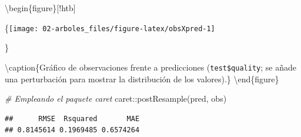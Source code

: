 \documentclass[
  spanish,
]{book}
\newenvironment{Shaded}{\begin{snugshade}}{\end{snugshade}}
\newcommand{\AttributeTok}[1]{\textcolor[rgb]{0.77,0.63,0.00}{#1}}
\newcommand{\CommentTok}[1]{\textcolor[rgb]{0.56,0.35,0.01}{\textit{#1}}}
\newcommand{\DecValTok}[1]{\textcolor[rgb]{0.00,0.00,0.81}{#1}}
\newcommand{\FunctionTok}[1]{\textcolor[rgb]{0.00,0.00,0.00}{#1}}
\newcommand{\NormalTok}[1]{#1}
\newcommand{\OtherTok}[1]{\textcolor[rgb]{0.56,0.35,0.01}{#1}}
\newcommand{\SpecialCharTok}[1]{\textcolor[rgb]{0.00,0.00,0.00}{#1}}
\newcommand{\StringTok}[1]{\textcolor[rgb]{0.31,0.60,0.02}{#1}}
\theoremstyle{break}
\theoremstyle{definition}
\theoremstyle{definition}
\theoremstyle{definition}
\theoremstyle{definition}
\theoremstyle{remark}
\begin{document}
\begin{Shaded}
\end{Shaded}

\textbackslash begin\{figure\}{[}!htb{]}

\{\centering \texttt{[image: 02-arboles\_files/figure-latex/obsXpred-1]}

\}

\textbackslash caption\{Gráfico de observaciones frente a predicciones (\texttt{test\$quality}; se añade una perturbación para mostrar la distribución de los valores).\}\label{fig:obsXpred}
\textbackslash end\{figure\}

\begin{Shaded}
\begin{Highlighting}[]
\CommentTok{\# Empleando el paquete caret }
\NormalTok{caret}\SpecialCharTok{::}\FunctionTok{postResample}\NormalTok{(pred, obs)}
\end{Highlighting}
\end{Shaded}

\begin{verbatim}
##      RMSE  Rsquared       MAE 
## 0.8145614 0.1969485 0.6574264
\end{verbatim}
\end{document}

